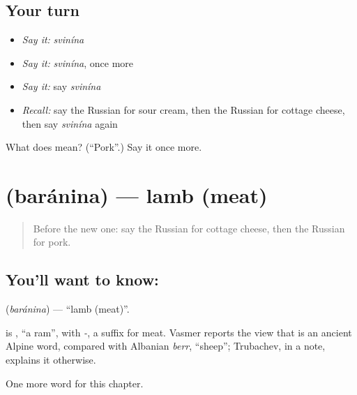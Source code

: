 \subsection*{Your turn}
\begin{itemize}
\raggedright
  \item \emph{Say it:} \emph{svinína}
  \item \emph{Say it:} \emph{svinína}, once more
  \item \emph{Say it:} say \emph{svinína}
  \item \emph{Recall:} say the Russian for sour cream, then the Russian for cottage cheese, then say \emph{svinína} again
\end{itemize}

\begin{tcolorbox}[breakable,colback=teal!4,colframe=teal!35!black,title={Before you move on}]
What does  mean? (\textquotedblleft{}Pork\textquotedblright{}.) Say it once more.
\end{tcolorbox}
\section[\texorpdfstring{\ru{баранина} (baránina)}{баранина (baránina)}]{ (baránina) — lamb (meat)}

\label{lesson:RU-C249-baranina}



\begin{quote}
Before the new one: say the Russian for cottage cheese, then the Russian for pork.
\end{quote}

\subsection*{You'll want to know: }
\textbf{} (\emph{baránina}) — \textquotedblleft{}lamb (meat)\textquotedblright{}.

\begin{cousinweb}
\textbf{} is \emph{}, \textquotedblleft{}a ram\textquotedblright{}, with \emph{-}, a suffix for meat. Vasmer reports the view that \emph{} is an ancient Alpine word, compared with Albanian \emph{berr}, \textquotedblleft{}sheep\textquotedblright{}; Trubachev, in a note, explains it otherwise.
\end{cousinweb}

\begin{grammarlens}[title={What you've built}]
One more word for this chapter.
\end{grammarlens}

